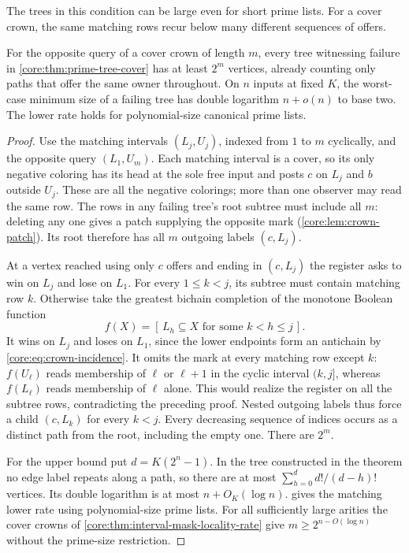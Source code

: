The trees in this condition can be large even for short prime lists.
For a cover crown, the same matching rows recur below many different
sequences of offers.

\begin{proposition}
\label{core:prop:prime-tree-size}
For the opposite query of a cover crown of length $m$, every tree
witnessing failure in \cref{core:thm:prime-tree-cover} has at least
$2^m$ vertices, already counting only paths that offer the same owner
throughout. On $n$ inputs at fixed $K$, the worst-case minimum size
of a failing tree has double logarithm $n+o(n)$ to base two. The
lower rate holds for polynomial-size canonical prime lists.
\end{proposition}
\begin{proof}
Use the matching intervals $(L_j,U_j)$, indexed from $1$ to $m$
cyclically, and the opposite query $(L_1,U_m)$. Each matching
interval is a cover, so its only negative coloring has its head at
the sole free input and posts $c$ on $L_j$ and $b$ outside $U_j$.
These are all the negative colorings; more than one observer may
read the same row. The rows in any failing tree's root subtree
must include all $m$: deleting any one gives a patch supplying the
opposite mark (\cref{core:lem:crown-patch}). Its root therefore has
all $m$ outgoing labels $(c,L_j)$.

At a vertex reached using only $c$ offers and ending in $(c,L_j)$
the register asks to win on $L_j$ and lose on $L_1$. For every
$1\le k<j$, its subtree must contain matching row $k$. Otherwise
take the greatest bichain completion of the monotone Boolean function
\[
             f(X)=[\,L_h\subseteq X\text{ for some }k<h\le j\,].
\]
It wins on $L_j$ and loses on $L_1$, since the lower endpoints form
an antichain by \eqref{core:eq:crown-incidence}. It omits the mark at
every matching row except $k$: $f(U_\ell)$ reads membership of
$\ell$ or $\ell+1$ in the cyclic interval $(k,j]$, whereas
$f(L_\ell)$ reads membership of $\ell$ alone. This would realize the
register on all the subtree rows, contradicting the preceding proof.
Nested outgoing labels thus force a child $(c,L_k)$ for every $k<j$.
Every decreasing sequence of indices occurs as a distinct path from
the root, including the empty one. There are $2^m$.

For the upper bound put $d=K(2^n-1)$. In the tree constructed in the
theorem no edge label repeats along a path, so there are at most
$\sum_{h=0}^d d!/(d-h)!$ vertices. Its double logarithm is at most
$n+O_K(\log n)$.  gives the
matching lower rate using polynomial-size prime lists. For all
sufficiently large arities the cover crowns of
\cref{core:thm:interval-mask-locality-rate} give
$m\ge 2^{n-O(\log n)}$ without the prime-size restriction.
\end{proof}

